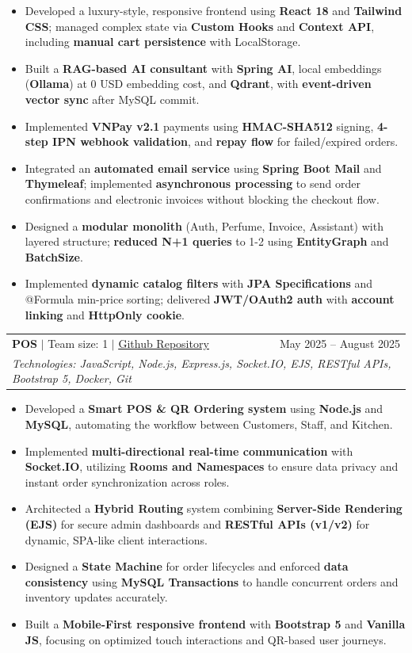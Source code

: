 \documentclass[letterpaper,11pt]{article}
\makeatletter
\newcommand{\resumeItem}[1]{
  \item\small{
    {#1 \vspace{-2pt}}
  }
}
\newcommand{\resumeProjectHeadingTwo}[3]{
    \item
    \begin{tabular*}{0.97\textwidth}[t]{l@{\extracolsep{\fill}}r}
      \small#1 & #2 \\[3pt]
      \multicolumn{2}{l}{#3} \\
    \end{tabular*}\vspace{-7pt}
}
\newcommand{\resumeItemListStart}{\begin{itemize}}
\newcommand{\resumeItemListEnd}{\end{itemize}\vspace{-5pt}}
\makeatother
\begin{document}
          \resumeItemListStart
            \resumeItem{Developed a luxury-style, responsive frontend using \textbf{React 18} and \textbf{Tailwind CSS}; managed complex state via \textbf{Custom Hooks} and \textbf{Context API}, including \textbf{manual cart persistence} with LocalStorage.}
            \resumeItem{Built a \textbf{RAG-based AI consultant} with \textbf{Spring AI}, local embeddings (\textbf{Ollama}) at 0 USD embedding cost, and \textbf{Qdrant}, with \textbf{event-driven vector sync} after MySQL commit.}
            \resumeItem{Implemented \textbf{VNPay v2.1} payments using \textbf{HMAC-SHA512} signing, \textbf{4-step IPN webhook validation}, and \textbf{repay flow} for failed/expired orders.}
            \resumeItem{Integrated an \textbf{automated email service} using \textbf{Spring Boot Mail} and \textbf{Thymeleaf}; implemented \textbf{asynchronous processing} to send order confirmations and electronic invoices without blocking the checkout flow.}
            \resumeItem{Designed a \textbf{modular monolith} (Auth, Perfume, Invoice, Assistant) with layered structure; \textbf{reduced N+1 queries} to 1-2 using \textbf{EntityGraph} and \textbf{BatchSize}.}
            \resumeItem{Implemented \textbf{dynamic catalog filters} with \textbf{JPA Specifications} and @Formula min-price sorting; delivered \textbf{JWT/OAuth2 auth} with \textbf{account linking} and \textbf{HttpOnly cookie}.}
            \resumeItemListEnd

        \resumeProjectHeadingTwo
          {\textbf{POS} $|$ Team size: 1 $|$ \href{https://github.com/tmdkhac12/POS}{\faIcon{github} \underline{Github Repository}}  }
          {May 2025 -- August 2025} 
          {\textit{\small \hspace{4pt}  Technologies: JavaScript, Node.js, Express.js, Socket.IO, EJS, RESTful APIs, Bootstrap 5,  Docker, Git}}

          \resumeItemListStart
            \resumeItem{Developed a \textbf{Smart POS \& QR Ordering system} using \textbf{Node.js} and \textbf{MySQL}, automating the workflow between Customers, Staff, and Kitchen.}
            \resumeItem{Implemented \textbf{multi-directional real-time communication} with \textbf{Socket.IO}, utilizing \textbf{Rooms and Namespaces} to ensure data privacy and instant order synchronization across roles.}
            \resumeItem{Architected a \textbf{Hybrid Routing} system combining \textbf{Server-Side Rendering (EJS)} for secure admin dashboards and \textbf{RESTful APIs (v1/v2)} for dynamic, SPA-like client interactions.}
            \resumeItem{Designed a \textbf{State Machine} for order lifecycles and enforced \textbf{data consistency} using \textbf{MySQL Transactions} to handle concurrent orders and inventory updates accurately.}
            \resumeItem{Built a \textbf{Mobile-First responsive frontend} with \textbf{Bootstrap 5} and \textbf{Vanilla JS}, focusing on optimized touch interactions and QR-based user journeys.}
            \resumeItemListEnd
          
\end{document}

